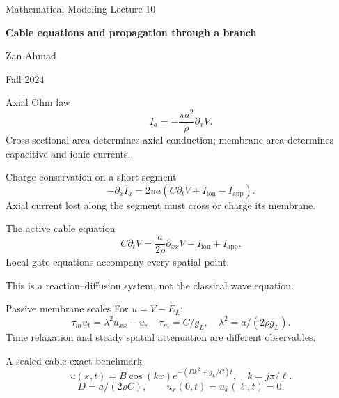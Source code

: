\documentclass[aspectratio=169,11pt]{beamer}
\newcommand{\notestarget}{notes.pdf}\newcommand{\noteslabel}{Notes}
\begin{document}
\begin{frame}[plain]\vfill
{\small\color{accent} Mathematical Modeling \quad Lecture 10}\par\medskip
{\raggedright{}\LARGE\bfseries\color{ink} Cable equations and propagation through a branch}\par\bigskip
Zan Ahmad\par\smallskip
{\small Fall 2024}\par\vfill\end{frame}
\renewcommand{\notestarget}{notes.pdf\#note-axial-conduction-and-local-charge-conservation}
\begin{frame}[t,fragile,label=slide-axial-ohm-law]{Axial Ohm law}
\[I_a=-\frac{\pi a^2}{\rho}\partial_xV.\]\pause{} Cross-sectional area determines axial conduction; membrane area determines capacitive and ionic currents.
\end{frame}
\renewcommand{\notestarget}{notes.pdf\#note-axial-conduction-and-local-charge-conservation}
\begin{frame}[t,fragile,label=slide-charge-conservation-on-a-short-segment]{Charge conservation on a short segment}
\[-\partial_xI_a=2\pi a(C\partial_tV+I_{\mathrm{ion}}-I_{\mathrm{app}}).\]\pause{} Axial current lost along the segment must cross or charge its membrane.
\end{frame}
\renewcommand{\notestarget}{notes.pdf\#note-axial-conduction-and-local-charge-conservation}
\begin{frame}[t,fragile,label=slide-the-active-cable-equation]{The active cable equation}
\[C\partial_tV=\frac a{2\rho}\partial_{xx}V-I_{\mathrm{ion}}+I_{\mathrm{app}}.\]\pause{} Local gate equations accompany every spatial point.\par\medskip This is a reaction--diffusion system, not the classical wave equation.
\end{frame}
\renewcommand{\notestarget}{notes.pdf\#note-passive-length-and-time-scales}
\begin{frame}[t,fragile,label=slide-passive-membrane-scales]{Passive membrane scales}
For $u=V-E_L$:\[\tau_m u_t=\lambda^2u_{xx}-u,\quad\tau_m=C/g_L,\quad\lambda^2=a/(2\rho g_L).\]\pause{} Time relaxation and steady spatial attenuation are different observables.
\end{frame}
\renewcommand{\notestarget}{notes.pdf\#note-passive-length-and-time-scales}
\begin{frame}[t,fragile,label=slide-a-sealed-cable-exact-benchmark]{A sealed-cable exact benchmark}
\[u(x,t)=B\cos(kx)e^{-(Dk^2+g_L/C)t},\quad k=j\pi/\ell.\]\pause{}\[D=a/(2\rho C),\qquad u_x(0,t)=u_x(\ell,t)=0.\]
\end{frame}
\end{document}
